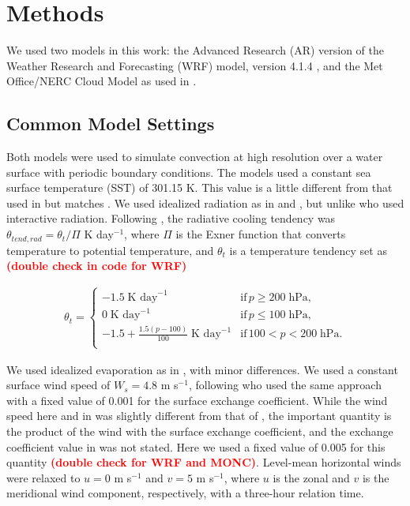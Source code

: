 \documentclass[draft]{agujournal2019}
\newcommand{\todo}[1]{\textcolor{red}{\textbf{(#1)}}}
\begin{document}
\section{Methods}
\label{sec:methods}

We used two models in this work: the Advanced Research (AR) version of the
Weather Research and Forecasting (WRF) model, version 4.1.4
\cite{Skamarock_2019}, and the Met Office/NERC Cloud Model
\cite<MONC,>{Brown_2020} as used in .

\subsection{Common Model Settings}

Both models were used to simulate convection at high resolution over a water
surface with periodic boundary conditions. The models used a constant sea
surface temperature (SST) of 301.15 K. This value is a little different from
that used in  but matches . We
used idealized radiation as in  and
, but unlike  who used interactive
radiation. Following , the radiative cooling tendency
was $\theta_{tend,rad} = \theta_t/\Pi$ K day$^{-1}$, where $\Pi$ is the Exner
function that converts temperature to potential temperature, and $\theta_t$ is a
temperature tendency set as \todo{double check in code for WRF}

\begin{align}
 \theta_t = \begin{cases}
    -1.5\; \textrm{K day}^{-1} & \textrm{if}\, p \geq 200\; \textrm{hPa}, \\
    0\; \textrm{K day}^{-1} & \textrm{if}\, p \leq 100\; \textrm{hPa}, \\
    -1.5 + \frac{1.5 (p-100)}{100}\; \textrm{K day}^{-1} & \textrm{if}\, 100 < p < 200\; \textrm{hPa}. \\
 \end{cases}
\end{align}

We used idealized evaporation as in , with minor
differences. We used a constant surface wind speed of $W_s = 4.8$ m s$^{-1}$,
following  who used the same approach with a fixed value
of 0.001 for the surface exchange coefficient. While the wind speed here and in
 was slightly different from that of
, the important quantity is the product of the wind with
the surface exchange coefficient, and the exchange coefficient value in
 was not stated. Here we used a fixed value of 0.005 for
this quantity \todo{double check for WRF and MONC}. Level-mean horizontal winds
were relaxed to $u = 0$ m s$^{-1}$ and $v = 5$ m s$^{-1}$, where $u$ is the
zonal and $v$ is the meridional wind component, respectively, with a three-hour
relation time.
\end{document}
